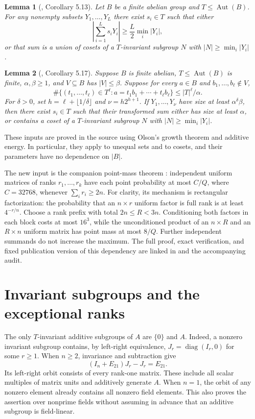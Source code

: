 \documentclass[11pt]{article}
\newtheorem{lemma}{Lemma}
\begin{document}
\begin{lemma}[\cite{source}, Corollary 5.13]\label{growth}
Let $B$ be a finite abelian group and $T\le\operatorname{Aut}(B)$.
For any nonempty subsets $Y_1,\ldots,Y_L$ there exist $s_i\in T$ such that
either
\[
 \left|\sum_{i=1}^L s_iY_i\right|\ge\frac L2\min_i|Y_i|,
\]
or that sum is a union of cosets of a $T$-invariant subgroup $N$
with $|N|\ge\min_i|Y_i|$.
\end{lemma}

\begin{lemma}[\cite{source}, Corollary 5.17]\label{energy}
Suppose $B$ is finite abelian, $T\le\operatorname{Aut}(B)$ is finite,
$\alpha,\beta\ge1$, and $V\subseteq B$ has $|V|\le\beta$.
Suppose for every $a\in B$ and $b_1,\ldots,b_\ell\notin V$,
\[
 \#\{(t_1,\ldots,t_\ell)\in T^\ell:
               a=t_1b_1+\cdots+t_\ell b_\ell\}\le |T|^\ell/\alpha.
\]
For $\delta>0$, set $h=\ell+\lfloor1/\delta\rfloor$ and $\nu=h2^{h+1}$.
If $Y_1,\ldots,Y_\nu$ have size at least $\alpha^\delta\beta$, then
there exist $s_i\in T$ such that their transformed sum either has size
at least $\alpha$, or contains a coset of a $T$-invariant subgroup $N$
with $|N|\ge\min_i|Y_i|$.
\end{lemma}

These inputs are proved in the source using Olson's growth theorem
and additive energy. In particular, they apply to unequal sets and to
cosets, and their parameters have no dependence on $|B|$.

The new input is the companion point-mass theorem \cite{rankbound}:
independent uniform matrices of ranks $r_1,\ldots,r_k$ have each point
probability at most $C/Q$, where $C=32768$, whenever $\sum_i r_i\ge2n$.
For clarity, its mechanism is rectangular factorization: the probability
that an $n\times r$ uniform factor is full rank is at least $4^{-r/n}$.
Choose a rank prefix with total $2n\le R<3n$. Conditioning both factors
in each block costs at most $16^3$, while the unconditioned product
of an $n\times R$ and an $R\times n$ uniform matrix has point mass
at most $8/Q$. Further independent summands do not increase the maximum.
The full proof, exact verification, and fixed publication version of
this dependency are linked in \cite{rankbound} and the accompanying audit.

\section*{Invariant subgroups and the exceptional ranks}
The only $T$-invariant additive subgroups of $A$ are $\{0\}$ and $A$.
Indeed, a nonzero invariant subgroup contains, by left-right equivalence,
$J_r=\operatorname{diag}(I_r,0)$ for some $r\ge1$.
When $n\ge2$, invariance and subtraction give
\[
 (I_n+E_{21})J_r-J_r=E_{21}.
\]
Its left-right orbit consists of every rank-one matrix. These include all
scalar multiples of matrix units and additively generate $A$.
When $n=1$, the orbit of any nonzero element already contains all
nonzero field elements. This also proves the assertion over nonprime fields
without assuming in advance that an additive subgroup is field-linear.
\end{document}
